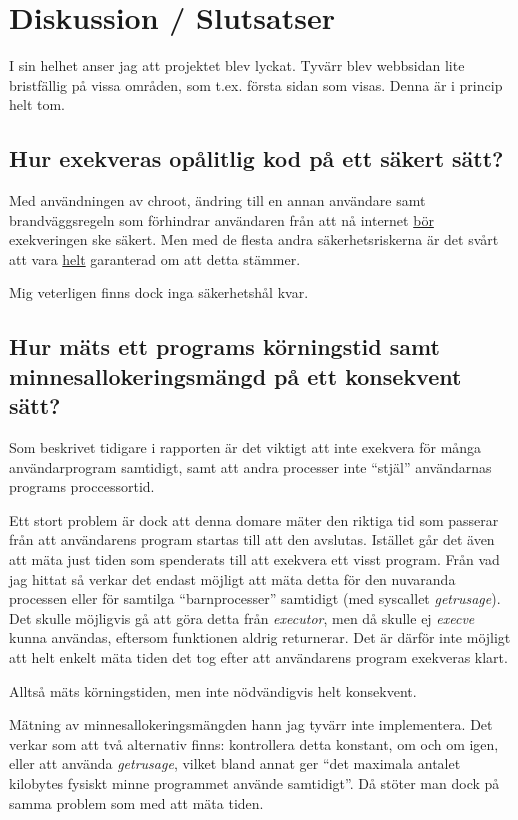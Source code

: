 \documentclass{article}
\begin{document}
\section{Diskussion / Slutsatser}

I sin helhet anser jag att projektet blev lyckat. Tyvärr blev webbsidan lite
bristfällig på vissa områden, som t.ex. första sidan som visas. Denna är i
princip helt tom.

\subsection{Hur exekveras opålitlig kod på ett säkert sätt?}

Med användningen av chroot, ändring till en annan användare samt
brandväggsregeln som förhindrar användaren från att nå internet \underline{bör}
exekveringen ske säkert. Men med de flesta andra säkerhetsriskerna är det svårt
att vara \underline{helt} garanterad om att detta stämmer.

Mig veterligen finns dock inga säkerhetshål kvar.

\subsection{Hur mäts ett programs körningstid samt minnesallokeringsmängd på
	ett konsekvent sätt?}

Som beskrivet tidigare i rapporten är det viktigt att inte exekvera för många
användarprogram samtidigt, samt att andra processer inte ``stjäl'' användarnas
programs proccessortid.

Ett stort problem är dock att denna domare mäter den riktiga tid som passerar
från att användarens program startas till att den avslutas. Istället går det
även att mäta just tiden som spenderats till att exekvera ett visst program.
Från vad jag hittat så verkar det endast möjligt att mäta detta för den
nuvaranda processen eller för samtilga ``barnprocesser'' samtidigt (med
syscallet \textit{getrusage}). Det skulle möjligvis gå att göra detta från
\textit{executor}, men då skulle ej \textit{execve} kunna användas, eftersom
funktionen aldrig returnerar. Det är därför inte möjligt att helt enkelt mäta
tiden det tog efter att användarens program exekveras klart.

Alltså mäts körningstiden, men inte nödvändigvis helt konsekvent.

Mätning av minnesallokeringsmängden hann jag tyvärr inte implementera. Det
verkar som att två alternativ finns: kontrollera detta konstant, om och om igen,
eller att använda \textit{getrusage}, vilket bland annat ger ``det maximala
antalet kilobytes fysiskt minne programmet använde samtidigt''. Då stöter man
dock på samma problem som med att mäta tiden.
\end{document}
